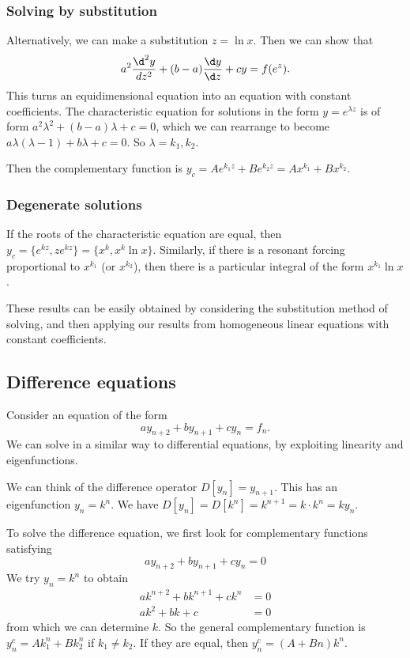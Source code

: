 \documentclass[a4paper]{article}
\begin{document}
\subsubsection*{Solving by substitution}
Alternatively, we can make a substitution $z = \ln x$. Then we can show that
\[
  a^2\frac{\d ^2 y}{d z^2} + (b - a)\frac{\d y}{\d z} + cy = f(e^z).
\]
This turns an equidimensional equation into an equation with constant coefficients. The characteristic equation for solutions in the form $y = e^{\lambda z}$ is of form $a^2\lambda^2 + (b - a)\lambda + c = 0$, which we can rearrange to become $a\lambda(\lambda - 1) + b\lambda + c = 0$. So $\lambda = k_1, k_2$.

Then the complementary function is $y_c = Ae^{k_1z} + Be^{k_2z} = Ax^{k_1} + Bx^{k_2}$.

\subsubsection*{Degenerate solutions}
If the roots of the characteristic equation are equal, then $y_c = \{e^{kz}, ze^{kz}\} = \{x^k, x^k\ln x\}$. Similarly, if there is a resonant forcing proportional to $x^{k_1}$ (or $x^{k_2}$), then there is a particular integral of the form $x^{k_1}\ln x$.

These results can be easily obtained by considering the substitution method of solving, and then applying our results from homogeneous linear equations with constant coefficients.

\subsection{Difference equations}
Consider an equation of the form
\[
  a y_{n + 2} + by_{n + 1} + cy_n = f_n.
\]
We can solve in a similar way to differential equations, by exploiting linearity and eigenfunctions.

We can think of the difference operator $D[y_n] = y_{n + 1}$. This has an eigenfunction $y_n = k^n$. We have $D[y_n] = D[k^n] = k^{n + 1} = k\cdot k^n = ky_n$.

To solve the difference equation, we first look for complementary functions satisfying
\[
  ay_{n + 2} + by_{n + 1} + cy_n = 0
\]
We try $y_n = k^n$ to obtain
\begin{align*}
  ak^{n + 2} + bk^{n + 1} + ck^n &= 0\\
  ak^2 + bk + c &= 0
\end{align*}
from which we can determine $k$. So the general complementary function is $y_n^c = Ak_1^n + Bk_2^n$ if $k_1 \not= k_2$. If they are equal, then $y_n^c = (A + Bn)k^n$.
\end{document}
